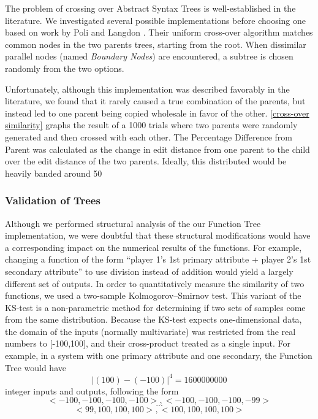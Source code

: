 \documentclass{acm_proc_article-sp}
\begin{document}
The problem of crossing over Abstract Syntax Trees is well-established in the literature. We investigated several possible implementations before choosing one based on work by Poli and Langdon \cite{crossover}. Their uniform cross-over algorithm matches common nodes in the two parents trees, starting from the root. When dissimilar parallel nodes (named \textit{Boundary Nodes}) are encountered, a subtree is chosen randomly from the two options. 

Unfortunately, although this implementation was described favorably in the literature, we found that it rarely caused a true combination of the parents, but instead led to one parent being copied wholesale in favor of the other. \ref{cross-over similarity} graphs the result of a 1000 trials where two parents were randomly generated and then crossed with each other. The Percentage Difference from Parent was calculated as the change in edit distance from one parent to the child over the edit distance of the two parents. Ideally, this distributed would be heavily banded around 50%
    
    \subsubsection{Validation of Trees}
    
Although we performed structural analysis of the our Function Tree implementation, we were doubtful that these structural modifications would have a corresponding impact on the numerical results of the functions. For example, changing a function of the form “player 1’s 1st primary attribute + player 2’s 1st secondary attribute” to use division instead of addition would yield a largely different set of outputs. In order to quantitatively measure the similarity of two functions, we used a two-sample Kolmogorov–Smirnov test. This variant of the KS-test is a non-parametric method for determining if two sets of samples come from the same distribution. 
Because the KS-test expects one-dimensional data, the domain of the inputs (normally multivariate) was restricted from the real numbers to [-100,100], and their cross-product treated as a single input. For example, in a system with one primary attribute and one secondary, the Function Tree would have $$|(100) - (-100)|^4 = 1600000000$$ integer inputs and outputs, following the form $$<-100, -100, -100, -100> , <-100, -100, -100, -99>$$
$$ ... $$
$$<99, 100, 100, 100> , <100, 100, 100, 100>$$ 
\end{document}
